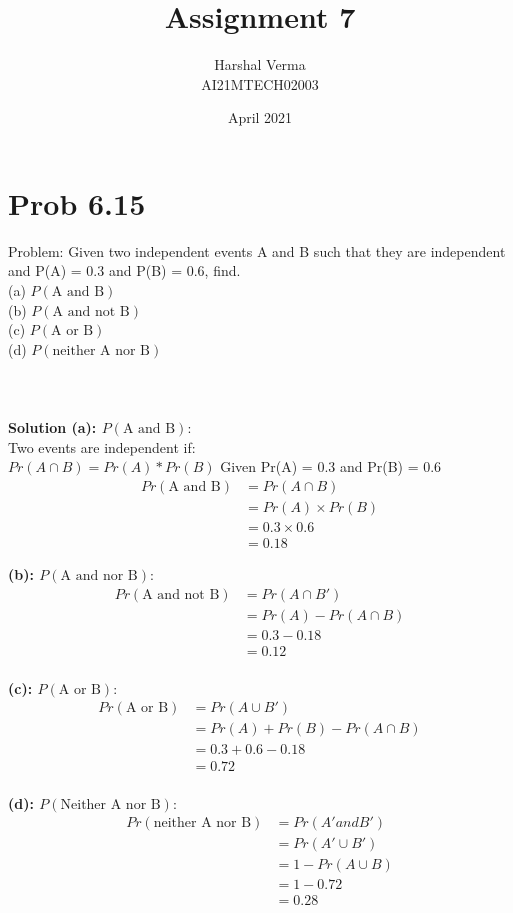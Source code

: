 \documentclass[journal,12pt,twocolumn]{IEEEtran}
\title{Assignment 7 }
\author{Harshal Verma\\
AI21MTECH02003}
\date{April 2021}
\begin{document}
\maketitle
\section{Prob 6.15}
Problem: Given two independent events A and B such that they are independent and P(A) = 0.3
 and P(B) = 0.6, find.\\
(a) $P(\text{A and B})$\\
(b) $P(\text{A and not B})$\\
(c) $P(\text{A or B} )$\\
(d) $P(\text{neither A nor B})$\\
\\
\\
\\
\textbf{Solution (a): $P(\text{A and B})$}:\\
Two events are independent if:\\ $Pr(A\cap B) = Pr(A)*Pr(B) $
 Given Pr(A) = 0.3 and Pr(B) = 0.6\\
 \begin{align}
     Pr( \text {A and B}) &= Pr(A \cap B) \\
     &= Pr(A)\times Pr(B)\\
     &= 0.3 \times 0.6\\
     &= 0.18
 \end{align}
 
 \textbf{ (b): $P(\text{A and nor B})$}:\\
\begin{align}
    Pr(\text{A and not B}) &= Pr(A \cap B')\\
    &=Pr(A) - Pr(A \cap B)\\
    &= 0.3 -0.18\\
    &=0.12\\
\end{align}

\textbf{ (c): $P(\text{A or B})$}:\\
\begin{align}
    Pr(\text{A or B}) &= Pr(A \cup B')\\
    &=Pr(A) +Pr(B) - Pr(A \cap B)\\
    &= 0.3 +0.6 - 0.18\\
    &=0.72\\
\end{align}

\textbf{ (d): $P(\text{Neither A nor B})$}:\\
\begin{align}
    Pr(\text{neither A nor B}) &=Pr(A' and B')\\
    &=Pr(A' \cup B')\\
    &= 1-Pr(A \cup B)\\
    &=1-0.72\\
    &= 0.28
\end{align}
\end{document}

